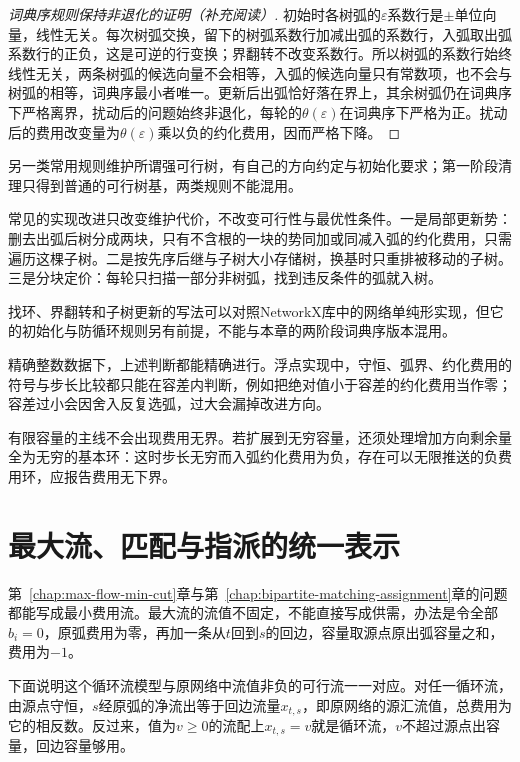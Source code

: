 \begin{proof}[词典序规则保持非退化的证明（补充阅读）]
初始时各树弧的$\varepsilon$系数行是$\pm$单位向量，线性无关。每次树弧交换，留下的树弧系数行加减出弧的系数行，入弧取出弧系数行的正负，这是可逆的行变换；界翻转不改变系数行。所以树弧的系数行始终线性无关，两条树弧的候选向量不会相等，入弧的候选向量只有常数项，也不会与树弧的相等，词典序最小者唯一。更新后出弧恰好落在界上，其余树弧仍在词典序下严格离界，扰动后的问题始终非退化，每轮的$\theta(\varepsilon)$在词典序下严格为正。扰动后的费用改变量为$\theta(\varepsilon)$乘以负的约化费用，因而严格下降。
\end{proof}

另一类常用规则维护所谓强可行树，有自己的方向约定与初始化要求；第一阶段清理只得到普通的可行树基，两类规则不能混用。

常见的实现改进只改变维护代价，不改变可行性与最优性条件。一是局部更新势：删去出弧后树分成两块，只有不含根的一块的势同加或同减入弧的约化费用，只需遍历这棵子树。二是按先序后继与子树大小存储树，换基时只重排被移动的子树。三是分块定价：每轮只扫描一部分非树弧，找到违反条件的弧就入树。

找环、界翻转和子树更新的写法可以对照NetworkX库中的网络单纯形实现，但它的初始化与防循环规则另有前提，不能与本章的两阶段词典序版本混用。

精确整数数据下，上述判断都能精确进行。浮点实现中，守恒、弧界、约化费用的符号与步长比较都只能在容差内判断，例如把绝对值小于容差的约化费用当作零；容差过小会因舍入反复选弧，过大会漏掉改进方向。

有限容量的主线不会出现费用无界。若扩展到无穷容量，还须处理增加方向剩余量全为无穷的基本环：这时步长无穷而入弧约化费用为负，存在可以无限推送的负费用环，应报告费用无下界。

\section{最大流、匹配与指派的统一表示}
\label{sec:graph-opt-mcf-unified}

第~\ref{chap:max-flow-min-cut}章与第~\ref{chap:bipartite-matching-assignment}章的问题都能写成最小费用流。最大流的流值不固定，不能直接写成供需，办法是令全部$b_i=0$，原弧费用为零，再加一条从$t$回到$s$的回边，容量取源点原出弧容量之和，费用为$-1$。

下面说明这个循环流模型与原网络中流值非负的可行流一一对应。对任一循环流，由源点守恒，$s$经原弧的净流出等于回边流量$x_{t,s}$，即原网络的源汇流值，总费用为它的相反数。反过来，值为$v\geq0$的流配上$x_{t,s}=v$就是循环流，$v$不超过源点出容量，回边容量够用。

